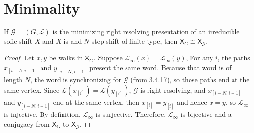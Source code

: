 \documentclass{article}
\newcommand{\Gc}{\mathcal{G}}  %
\newcommand{\Hc}{\mathcal{H}}  %
\newcommand{\GtH}{\Gc^\to\Hc}
\newcommand{\shift}[1]{\mathsf{X}_{#1}}
\theoremstyle{definition}
\begin{document}


\newpage

\section{Minimality}



    \begin{theorem}
        If \(\mathcal{G} = (G, \mathcal{L})\) is the minimizing right resolving
        presentation of an irreducible sofic shift \(X\) and \(X\) is and
        \(N\)-step shift of finite type, then \(\shift{G} \cong \shift{\Gc}\).
    \end{theorem}
    
    \begin{proof}
        Let \(x, y\) be walks in \(\shift{G}\). Suppose \(\mathcal{L}_\infty(x)=\mathcal{L}_\infty(y)\),
        For any \(i\), the paths \(x_{[i-N, i-1]}\) and \(y_{[i-N, i-1]}\) present 
        the same word. Because that word is of length \(N\), the word is synchronizing
        for \(\mathcal{G}\) (from 3.4.17), so those paths end at the same vertex. Since
        \(\mathcal{L}(x_{[i]}) = \mathcal{L}(y_{[i]})\), \(\mathcal{G}\) is right 
        resolving, and \(x_{[i-N, i-1]}\) and \(y_{[i-N, i-1]}\) end at the same vertex,
        then \(x_{[i]} = y_{[i]}\) and hence \(x = y\), so \(\mathcal{L}_\infty\) is injective.
        By definition, \(\mathcal{L}_\infty\) is surjective. Therefore, \(\mathcal{L}_\infty\) is bijective and 
        a conjugacy from \(\mathsf{X}_G\) to \(\mathsf{X}_\mathcal{G}\).
    \end{proof}
\end{document}
